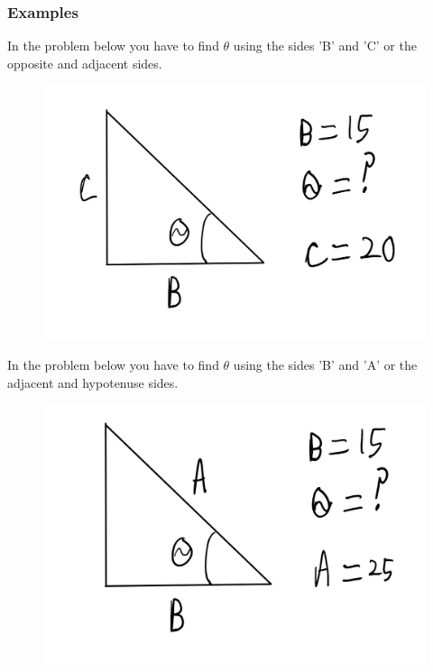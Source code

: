 \documentclass[12pt]{article}
\begin{document}
\subsubsection{Examples}

In the problem below you have to find $\theta$ using the sides 'B' and 'C' or the opposite and adjacent sides.
\begin{figure}[h]
\includegraphics[scale=0.15]{TrigInverseProb1.png}
\end{figure}

\parbox[][6cm][t]{8cm}{}


In the problem below you have to find $\theta$ using the sides 'B' and 'A' or the adjacent and hypotenuse sides.
\begin{figure}[h]
\includegraphics[scale=0.25]{TrigInverseProb2.png}
\end{figure}
\end{document}
